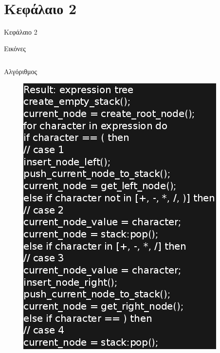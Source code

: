 \documentclass[12pt,t,aspectratio=169,xcolor=table]{beamer}
\begin{document}
\section{Κεφάλαιο 2}
\begin{frame}[plain,c]
\begin{center}
\Huge Κεφάλαιο 2
\end{center}
\end{frame}

\begin{frame}{Εικόνες}
\begin{columns}[T] %
\begin{column}{.5\textwidth}

\centering
Αλγόριθμος
	\begin{figure}[h!]
		\includegraphics[scale=0.3]{expression_tree_algorithm}
	\end{figure}


\end{column}
\end{columns}
\end{frame}
\end{document}
